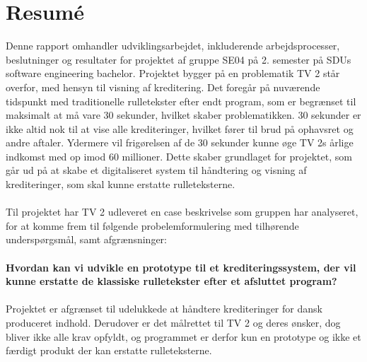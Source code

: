 \clearpage
\section{Resumé}
\begin{comment}
En  kort  introduktion  til  projektet  -  hvad  blev der arbejdet med og hvorfor.

•Problemformuleringen og vigtige afgrænsninger.

•Metode - hvordan angreb I problemet og hvordan realiserede I løsningen (hvem, hvad, hvornår og hvorfor)

•Hovedresultater og konklusioner – hvad kom derud af arbejde
\end{comment}

Denne rapport omhandler udviklingsarbejdet, inkluderende arbejdsprocesser, beslutninger og resultater for projektet af gruppe SE04 på 2. semester på SDUs software engineering bachelor. Projektet bygger på en problematik TV 2 står overfor, med hensyn til visning af kreditering. Det foregår på nuværende tidspunkt med traditionelle rulletekster efter endt program, som er begrænset til maksimalt at må vare 30 sekunder, hvilket skaber problematikken. 30 sekunder er ikke altid nok til at vise alle krediteringer, hvilket fører til brud på ophavsret og andre aftaler. Ydermere vil frigørelsen af de 30 sekunder kunne øge TV 2s årlige indkomst med op imod 60 millioner. Dette skaber grundlaget for projektet, som går ud på at skabe et digitaliseret system til håndtering og visning af krediteringer, som skal kunne erstatte rulleteksterne.
\\\\
Til projektet har TV 2 udleveret en case beskrivelse som gruppen har analyseret, for at komme frem til følgende probelemformulering med tilhørende underspørgsmål, samt afgrænsninger:
\\\\
\textbf{Hvordan kan vi udvikle en prototype til et krediteringssystem, der vil kunne erstatte de klassiske rulletekster efter et afsluttet program?}
\\\\
Projektet er afgrænset til udelukkede at håndtere krediteringer for dansk produceret indhold. Derudover er det målrettet til TV 2 og deres ønsker, dog bliver ikke alle krav opfyldt, og programmet er derfor kun en prototype og ikke et færdigt produkt der kan erstatte rulleteksterne.

